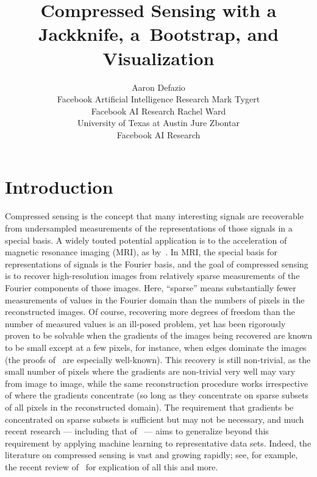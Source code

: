 \documentclass[article]{jdssv}
\author{Aaron Defazio\\Facebook Artificial Intelligence Research \And
        Mark Tygert\\Facebook AI Research \AND
        Rachel Ward\\University of Texas at Austin \And
        Jure Zbontar\\Facebook AI Research}
\title{Compressed Sensing with a Jackknife, a~Bootstrap, and Visualization}
\begin{document}


\section{Introduction}

Compressed sensing is the concept that many interesting signals are recoverable
from undersampled measurements of the representations of those signals
in a special basis. A widely touted potential application
is to the acceleration of magnetic resonance imaging (MRI),
as by~\citet{lustig-donoho-pauly}.
In MRI, the special basis for representations of signals is the Fourier basis,
and the goal of compressed sensing is to recover high-resolution images
from relatively sparse measurements of the Fourier components of those images.
Here, ``sparse'' means substantially fewer measurements of values
in the Fourier domain than the numbers of pixels in the reconstructed images.
Of course, recovering more degrees of freedom than the number of measured
values is an ill-posed problem, yet has been rigorously proven to be solvable
when the gradients of the images being recovered are known to be small
except at a few pixels, for instance, when edges dominate the images
(the proofs of~\citet{candes-romberg-tao} are especially well-known).
This recovery is still non-trivial,
as the small number of pixels where the gradients are non-trivial
very well may vary from image to image, while the same reconstruction procedure
works irrespective of where the gradients concentrate (so long as they
concentrate on sparse subsets of all pixels in the reconstructed domain).
The requirement that gradients be concentrated on sparse subsets
is sufficient but may not be necessary, and much recent research
--- including that
of~\citet{hammernik-klatzer-kobler-recht-sodickson-pock-knoll} --- aims
to generalize beyond this requirement by applying machine learning
to representative data sets. Indeed, the literature on compressed sensing
is vast and growing rapidly; see, for example,
the recent review of~\citet{tropp} for explication of all this and more.
\end{document}
